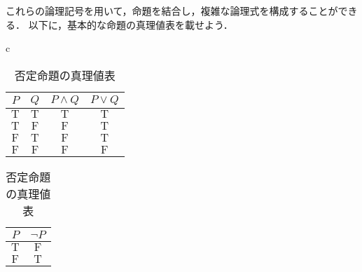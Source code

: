 \documentclass[a4paper,11pt]{ltjsarticle}
\begin{document}
これらの論理記号を用いて，命題を結合し，複雑な論理式を構成することができる．
以下に，基本的な命題の真理値表を載せよう．

\begin{table}[htbp]
  \begin{center}
    \begin{tabular}{c}

      \begin{minipage}{0.3\hsize}
        \begin{center}
          \caption{論理和（積）の真理値表}
          \label{fig:論理和（積）の真理値表}
          \begin{tabular}{|c|c|c|c|} \hline
            $P$           & $Q$          & $P \land Q$   & $P \lor Q$    \\ \hline
            $\mathrm{T}$  & $\mathrm{T}$ & $\mathrm{T}$  & $\mathrm{T}$  \\ \hline
            $\mathrm{T} $ & $\mathrm{F}$ & $\mathrm{F}$  & $\mathrm{T}$  \\ \hline
            $\mathrm{F} $ & $\mathrm{T}$ & $\mathrm{F} $ & $\mathrm{T}$  \\  \hline
            $\mathrm{F}$  & $\mathrm{F}$ & $\mathrm{F}$  & $\mathrm{F} $ \\ \hline
          \end{tabular}
        \end{center}
      \end{minipage}

      \begin{minipage}{0.3\hsize}
        \begin{center}
          \caption{否定命題の真理値表}
          \label{fig:否定命題の真理値表}
          \begin{tabular}{|c|c|} \hline
            $P $         & $\lnot P$    \\ \hline
            $\mathrm{T}$ & $\mathrm{F}$ \\ \hline
            $\mathrm{F}$ & $\mathrm{T}$ \\\hline
          \end{tabular}
        \end{center}
      \end{minipage}


\end{tabular}
\end{center}
\end{table}
\end{document}
